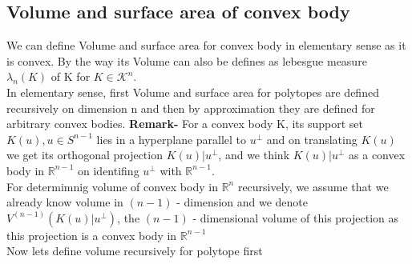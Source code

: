 \documentclass[oneside]{book}
\begin{document}
 \subsection{Volume and surface area of convex body}
We can define Volume and surface area for convex body in elementary sense as it is convex. By the way its Volume can also be defines as lebesgue measure $\lambda_{n}(K)$ of K  for $ K \in  \mathcal{K}^{n} $. \\
In elementary sense, first Volume and surface area for polytopes are defined recursively on dimension n and then by approximation they are defined for  arbitrary convex bodies. \newline
\textbf{Remark-} 
For a convex body  K, its support set $K(u),u \in S^{n-1} $ lies in a hyperplane parallel to 
$u^{\perp}$ and on translating $K(u)$ we get its orthogonal projection $K(u) | u^{\perp}$, and we think  $K(u) | u^{\perp}$ as a convex body in $\mathbb{R}^{n-1}$  on identifing $u^{\perp}$ with $\mathbb{R}^{n-1}$. \\
  For determimnig volume of convex body in $\mathbb{R}^{n}$ recursively, we assume that we already  know volume in $(n-1)$ - dimension and we denote $V^{(n-1)}\left(K(u) | u^{\perp}\right)$, the $(n-1)$ - dimensional volume of this projection as this projection is a convex body in $\mathbb{R}^{n-1}$ 
\\
Now lets define volume recursively for polytope first 
\end{document}
